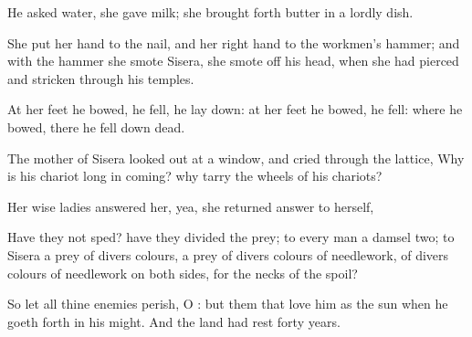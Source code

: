 {He
asked
water,
{} she
gave
{}
milk; she brought
forth
butter in a
lordly
dish.

She
put her
hand to the
nail, and her right
hand to the
workmen’s
hammer; and with the hammer she
smote
Sisera, she smote
off his
head, when she had
pierced and stricken
through his
temples.

At her
feet he
bowed, he
fell, he lay
down: at her
feet he
bowed, he
fell:
where he
bowed, there he fell
down
dead.

The
mother of
Sisera
looked out at a
window, and
cried through the
lattice, Why is his
chariot
{}
long in
coming? why
tarry the
wheels of his
chariots?

Her
wise
ladies
answered her, yea, she
returned
answer to herself,

Have they not
sped? have they
{}
divided the
prey; to
every
man a
damsel
{}
two; to
Sisera a
prey of divers
colours, a
prey of divers
colours of
needlework, of divers
colours of needlework on both
sides,
{} for the
necks of
{} the
spoil?

So let all thine
enemies
perish, O
{}: but
{} them that
love him
{} as the
sun when he goeth
forth in his
might. And the
land had
rest
forty
years.




\par }
